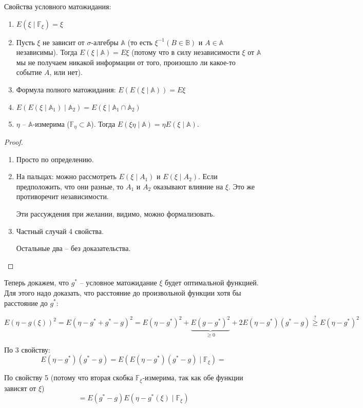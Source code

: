 \begin{theorem}
Свойства условного матожидания:
\begin{enumerate}
\item $E(\xi \mid \mathbb{F}_\xi) = \xi$
\item Пусть $\xi$ не зависит от $\sigma$-алгебры $\mathbb{A}$ (то есть $\xi^{-1}(B \in \mathbb{B})$ и $A \in \mathbb{A}$ независимы).
Тогда $E(\xi \mid \mathbb{A}) = E\xi$ (потому что в силу независимости $\xi$ от $\mathbb{A}$ мы не получаем никакой информации от того, произошло ли какое-то событие $A$, или нет).
\item Формула полного матожидания: $E(E(\xi \mid \mathbb{A})) = E\xi$
\item $E(E(\xi \mid \mathbb{A}_1) \mid \mathbb{A}_2) = E(\xi \mid \mathbb{A}_1 \cap \mathbb{A}_2)$
\item $\eta$ -- $\mathbb{A}$-измерима ($\mathbb{F}_\eta \subset \mathbb{A}$). Тогда $E(\xi\eta \mid \mathbb{A}) = \eta E(\xi \mid \mathbb{A})$.
\end{enumerate}
\end{theorem}
\begin{proof}
\begin{enumerate}
\item  Просто по определению.
\item  На пальцах: можно рассмотреть $E (\xi \mid A_1)$ и $E (\xi \mid A_2)$. 
Если предположить, что они разные, то $A_1$ и $A_2$ оказывают влияние на $\xi$. 
Это же противоречит независимости.

Эти рассуждения при желании, видимо, можно формализовать.

\item Частный случай 4 свойства.

Остальные два -- без доказательства.
\end{enumerate}
\end{proof}

Теперь докажем, что $g^*$ -- условное матожидание $\xi$ будет оптимальной функцией.
Для этого надо доказать, что расстояние до произвольной функции хотя бы расстояние до $g^*$:

$$E(\eta - g(\xi))^2 = E(\eta - g^* + g^* - g)^2 =E(\eta - g^*)^2 + \underbrace{E(g - g^*)^2}_{\geq 0} + 2E(\eta - g^*)(g^* - g) \stackrel{?}{\geq} E(\eta - g^*)^2$$


По 3 свойству:
$$E(\eta - g^*)(g^* - g) = E(E(\eta - g^*)(g^* - g) \mid \mathbb{F}_\xi) = $$

По свойству 5 (потому что вторая скобка $\mathbb{F}_\xi$-измерима, так как обе функции зависят от $\xi$)
$$= E(g^* - g) E(\eta - g^*(\xi) \mid \mathbb{F}_\xi)$$

